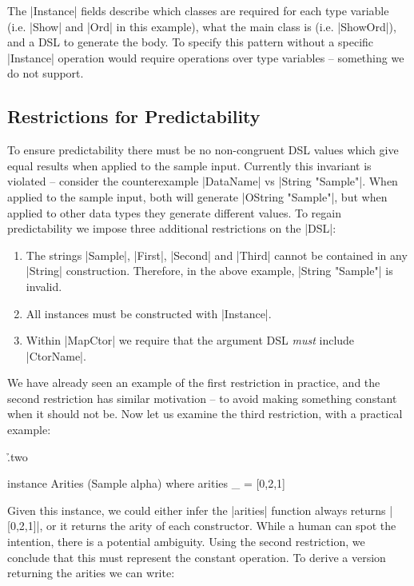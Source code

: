 \documentclass{llncs}
\begin{document}
The |Instance| fields describe which classes are required for each type variable (i.e. |Show| and |Ord| in this example), what the main class is (i.e. |ShowOrd|), and a DSL to generate the body. To specify this pattern without a specific |Instance| operation would require operations over type variables -- something we do not support.

\subsection{Restrictions for Predictability}
\label{sec:predictability}

To ensure predictability there must be no non-congruent DSL values which give equal results when applied to the sample input. Currently this invariant is violated -- consider the counterexample |DataName| vs |String "Sample"|. When applied to the sample input, both will generate |OString "Sample"|, but when applied to other data types they generate different values. To regain predictability we impose three additional restrictions on the |DSL|:

\begin{enumerate}
\item The strings |Sample|, |First|, |Second| and |Third| cannot be contained in any |String| construction. Therefore, in the above example, |String "Sample"| is invalid.
\item All instances must be constructed with |Instance|.
\item Within |MapCtor| we require that the argument DSL \textit{must} include |CtorName|.
\end{enumerate}

We have already seen an example of the first restriction in practice, and the second restriction has similar motivation -- to avoid making something constant when it should not be. Now let us examine the third restriction, with a practical example:

\h{.two}\begin{code}
instance Arities (Sample alpha) where
    arities _ = [0,2,1]
\end{code}

Given this instance, we could either infer the |arities| function always returns |[0,2,1]|, or it returns the arity of each constructor. While a human can spot the intention, there is a potential ambiguity. Using the second restriction, we conclude that this must represent the constant operation. To derive a version returning the arities we can write:
\end{document}
